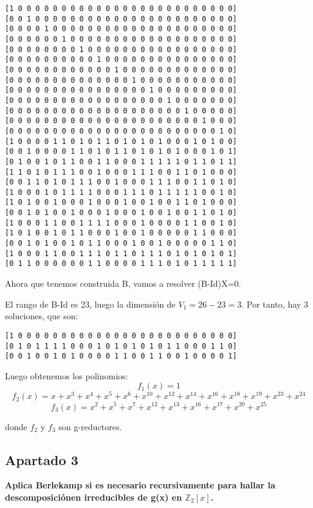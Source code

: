 \documentclass[a4paper]{article}
\begin{document}
\begin{verbatim}
[1 0 0 0 0 0 0 0 0 0 0 0 0 0 0 0 0 0 0 0 0 0 0 0 0 0]
[0 0 1 0 0 0 0 0 0 0 0 0 0 0 0 0 0 0 0 0 0 0 0 0 0 0]
[0 0 0 0 1 0 0 0 0 0 0 0 0 0 0 0 0 0 0 0 0 0 0 0 0 0]
[0 0 0 0 0 0 1 0 0 0 0 0 0 0 0 0 0 0 0 0 0 0 0 0 0 0]
[0 0 0 0 0 0 0 0 1 0 0 0 0 0 0 0 0 0 0 0 0 0 0 0 0 0]
[0 0 0 0 0 0 0 0 0 0 1 0 0 0 0 0 0 0 0 0 0 0 0 0 0 0]
[0 0 0 0 0 0 0 0 0 0 0 0 1 0 0 0 0 0 0 0 0 0 0 0 0 0]
[0 0 0 0 0 0 0 0 0 0 0 0 0 0 1 0 0 0 0 0 0 0 0 0 0 0]
[0 0 0 0 0 0 0 0 0 0 0 0 0 0 0 0 1 0 0 0 0 0 0 0 0 0]
[0 0 0 0 0 0 0 0 0 0 0 0 0 0 0 0 0 0 1 0 0 0 0 0 0 0]
[0 0 0 0 0 0 0 0 0 0 0 0 0 0 0 0 0 0 0 0 1 0 0 0 0 0]
[0 0 0 0 0 0 0 0 0 0 0 0 0 0 0 0 0 0 0 0 0 0 1 0 0 0]
[0 0 0 0 0 0 0 0 0 0 0 0 0 0 0 0 0 0 0 0 0 0 0 0 1 0]
[1 0 0 0 0 1 1 0 1 0 1 1 0 1 0 1 0 1 0 0 0 1 0 1 0 0]
[0 0 1 0 0 0 0 1 1 0 1 0 1 1 0 1 0 1 0 1 0 0 0 1 0 1]
[0 1 0 0 1 0 1 1 0 0 1 1 0 0 0 1 1 1 1 1 0 1 1 0 1 1]
[1 1 0 1 0 1 1 1 0 0 1 0 0 0 1 1 1 0 0 1 1 0 1 0 0 0]
[0 0 1 1 0 1 0 1 1 1 0 0 1 0 0 0 1 1 1 0 0 1 1 0 1 0]
[1 0 0 0 1 0 1 1 1 1 0 0 0 1 1 1 0 1 1 1 1 1 0 0 1 0]
[1 0 1 0 0 1 0 0 0 1 0 0 0 1 0 0 1 0 0 1 1 0 1 0 0 0]
[0 0 1 0 1 0 0 1 0 0 0 1 0 0 0 1 0 0 1 0 0 1 1 0 1 0]
[1 0 0 0 1 1 0 0 1 1 1 1 0 0 0 1 0 0 0 0 1 1 0 0 1 0]
[1 0 1 0 0 1 0 1 1 0 0 0 1 0 0 1 0 0 0 0 0 1 1 0 0 0]
[0 0 1 0 1 0 0 1 0 1 1 0 0 0 1 0 0 1 0 0 0 0 0 1 1 0]
[1 0 0 0 1 1 0 0 1 1 1 0 1 1 0 1 1 1 0 1 0 1 0 1 0 1]
[0 1 1 0 0 0 0 0 0 1 1 0 0 0 0 1 1 1 0 1 0 1 1 1 1 1]
\end{verbatim}

Ahora que tenemos construida B, vamos a resolver (B-Id)X=0.

El rango de B-Id es 23, luego la dimensión de $V_1=26-23=3$. Por tanto, hay $3$ soluciones, que son:

\begin{verbatim}
[1 0 0 0 0 0 0 0 0 0 0 0 0 0 0 0 0 0 0 0 0 0 0 0 0 0]
[0 1 0 1 1 1 1 0 0 0 1 0 1 0 1 0 1 0 1 1 0 0 0 1 1 0]
[0 0 1 0 0 1 0 1 0 0 0 0 1 1 0 0 1 1 0 0 1 0 0 0 0 1]
\end{verbatim}

Luego obtenemos los polinomios:
$$f_1(x) = 1$$
$$f_2(x) = x+x^3+x^4+x^5+x^6+x^{10}+x^{12}+x^{14}+x^{16}+x^{18}+x^{19}+x^{23}+x^{24}$$
$$f_3(x) = x^2+x^5+x^7+x^{12}+x^{13}+x^{16}+x^{17}+x^{20}+x^{25}$$

donde $f_2$ y $f_3$ son g-reductores.

\subsection{Apartado 3}
\textbf{Aplica Berlekamp si es necesario recursivamente para hallar la descomposiciónen irreducibles de g(x) en $\mathbb{Z}_2[x]$.}
\end{document}
